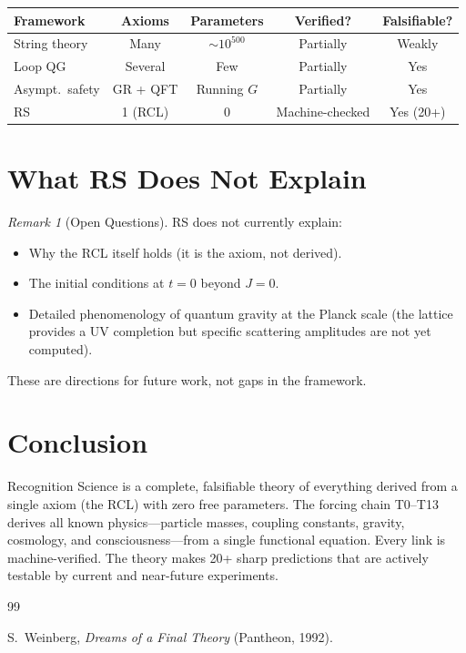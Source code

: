 \documentclass[12pt,a4paper]{article}
\theoremstyle{definition}
\theoremstyle{remark}
\newtheorem{remark}[theorem]{Remark}
\begin{document}
\begin{center}
\renewcommand{\arraystretch}{1.3}
\begin{tabular}{lcccc}
\hline
\textbf{Framework} & \textbf{Axioms} &
\textbf{Parameters} & \textbf{Verified?} &
\textbf{Falsifiable?} \\
\hline
String theory & Many & $\sim 10^{500}$ & Partially & Weakly \\
Loop QG & Several & Few & Partially & Yes \\
Asympt.\ safety & GR + QFT & Running $G$ & Partially & Yes \\
RS & 1 (RCL) & 0 & Machine-checked & Yes (20+) \\
\hline
\end{tabular}
\end{center}

\section{What RS Does Not Explain}
\label{sec:limits}

\begin{remark}[Open Questions]
RS does not currently explain:
\begin{itemize}
  \item Why the RCL itself holds (it is the axiom, not derived).
  \item The initial conditions at $t = 0$ beyond $J = 0$.
  \item Detailed phenomenology of quantum gravity at the Planck
  scale (the lattice provides a UV completion but specific
  scattering amplitudes are not yet computed).
\end{itemize}
These are directions for future work, not gaps in the framework.
\end{remark}

\section{Conclusion}
\label{sec:conclusion}

Recognition Science is a complete, falsifiable theory of everything
derived from a single axiom (the RCL) with zero free parameters.
The forcing chain T0--T13 derives all known physics---particle
masses, coupling constants, gravity, cosmology, and
consciousness---from a single functional equation.  Every link is
machine-verified.  The theory makes 20+ sharp predictions that are
actively testable by current and near-future experiments.

\begin{thebibliography}{99}

S.~Weinberg, \textit{Dreams of a Final Theory} (Pantheon, 1992).

\end{thebibliography}
\end{document}
